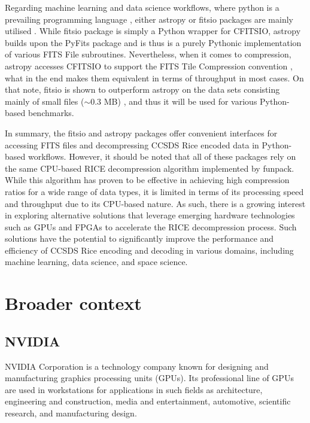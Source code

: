 \documentclass[licencjacka,en]{pracamgr}
\begin{document}
Regarding machine learning and data science workflows, where python is a prevailing programming language \cite{dev-survey}, either astropy or fitsio packages are mainly utilised \cite{astropy} \cite{fitsio} . While fitsio package is simply a Python wrapper for CFITSIO, astropy builds upon the PyFits package and is thus is a purely Pythonic implementation of various FITS File subroutines. Nevertheless, when it comes to compression, astropy accesses CFITSIO to support the FITS Tile Compression convention \cite{astropy}, what in the end makes them equivalent in terms of throughput in most cases. On that note, fitsio is shown to outperform astropy on the data sets consisting mainly of small files ($\sim0.3$ MB) \cite{astropy vs fitsio}, and thus it will be used for various Python-based benchmarks.

In summary, the fitsio and astropy packages offer convenient interfaces for accessing FITS files and decompressing CCSDS Rice encoded data in Python-based workflows. However, it should be noted that all of these packages rely on the same CPU-based RICE decompression algorithm implemented by funpack. While this algorithm has proven to be effective in achieving high compression ratios for a wide range of data types, it is limited in terms of its processing speed and throughput due to its CPU-based nature. As such, there is a growing interest in exploring alternative solutions that leverage emerging hardware technologies such as GPUs and FPGAs to accelerate the RICE decompression process. Such solutions have the potential to significantly improve the performance and efficiency of CCSDS Rice encoding and decoding in various domains, including machine learning, data science, and space science.

\chapter{Broader context}\label{r:context}

\section{NVIDIA}
NVIDIA Corporation is a technology company known for designing and manufacturing graphics processing units (GPUs). Its professional line of GPUs are used in workstations for applications in such fields as architecture, engineering and construction, media and entertainment, automotive, scientific research, and manufacturing design. 
\end{document}
